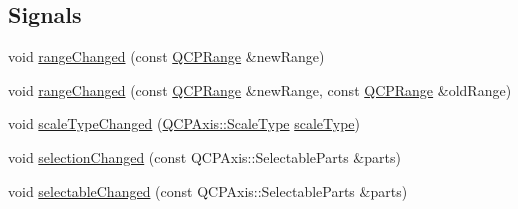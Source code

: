 \subsection*{Signals}
\begin{DoxyCompactItemize}
\item 
void \hyperlink{class_q_c_p_axis_a0894084e4c16a1736534c4095746f910}{range\+Changed} (const \hyperlink{class_q_c_p_range}{Q\+C\+P\+Range} \&new\+Range)
\item 
void \hyperlink{class_q_c_p_axis_aac8576288e8e31f16186124bc10dd10d}{range\+Changed} (const \hyperlink{class_q_c_p_range}{Q\+C\+P\+Range} \&new\+Range, const \hyperlink{class_q_c_p_range}{Q\+C\+P\+Range} \&old\+Range)
\item 
void \hyperlink{class_q_c_p_axis_a3505ed8a93bd2e349d858d84996bf767}{scale\+Type\+Changed} (\hyperlink{class_q_c_p_axis_a36d8e8658dbaa179bf2aeb973db2d6f0}{Q\+C\+P\+Axis\+::\+Scale\+Type} \hyperlink{class_q_c_p_axis_ad23e9ad97b44e9aeaf4fab8904280098}{scale\+Type})
\item 
void \hyperlink{class_q_c_p_axis_a62b598abeee7174a05f9d542cc85b1f5}{selection\+Changed} (const Q\+C\+P\+Axis\+::\+Selectable\+Parts \&parts)
\item 
void \hyperlink{class_q_c_p_axis_aa5ff1fd851139028a3bb4efcb31de9fc}{selectable\+Changed} (const Q\+C\+P\+Axis\+::\+Selectable\+Parts \&parts)
\end{DoxyCompactItemize}
